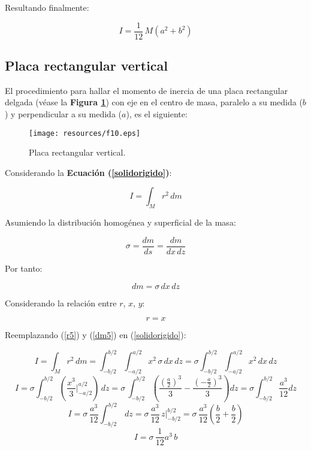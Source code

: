 \documentclass[letter,oneside,11pt]{article}
\begin{document}
Resultando finalmente:

\begin{equation}
    I = \frac{1}{12}\, M (a^2 + b^2)
\end{equation}

\subsection{Placa rectangular vertical}
El procedimiento para hallar el momento de inercia de una placa rectangular
delgada (véase la \textbf{Figura \ref{figura10}}) con eje en el centro de masa,
paralelo a su medida ($b$) y perpendicular a su medida ($a$), es el siguiente:

\begin{figure}
\centering
\texttt{[image: resources/f10.eps]}
\caption{Placa rectangular vertical.}
\label{figura10}
\end{figure}

Considerando la \textbf{Ecuación (\ref{solidorigido})}:

\begin{equation*}
    I = \int_{M} r^2\, dm
\tag{4}
\end{equation*}

Asumiendo la distribución homogénea y superficial de la masa:

\begin{equation*}
    \sigma = \frac{dm}{ds} = \frac{dm}{dx\, dz}
\end{equation*}

Por tanto:

\begin{equation}
    dm = \sigma\, dx\, dz
\label{dm5}
\end{equation}

Considerando la relación entre $r$, $x$, $y$:

\begin{equation}
    r = x
\label{r5}
\end{equation}

Reemplazando (\ref{r5}) y (\ref{dm5}) en (\ref{solidorigido}):

\begin{equation*}
    I = \int_{M} r^2\, dm = \int_{-b/2}^{b/2} \int_{-a/2}^{a/2} x^2\, \sigma\, dx\, dz = \sigma \int_{-b/2}^{b/2} \int_{-a/2}^{a/2} x^2\, dx\, dz
\end{equation*}
\begin{equation*}
    I = \sigma \int_{-b/2}^{b/2} \left( \frac{x^3}{3} \Biggr|_{-a/2}^{a/2} \right) \, dz = \sigma\, \int_{-b/2}^{b/2} \left( \frac{(\frac{a}{2})^3}{3} - \frac{(-\frac{a}{2})^3}{3} \right) dz = \sigma \int_{-b/2}^{b/2} \frac{a^3}{12} dz
\end{equation*}
\begin{equation*}
    I = \sigma\, \frac{a^3}{12} \int_{-b/2}^{b/2}\, dz = \sigma\, \frac{a^3}{12}\, z \Biggr|_{-b/2}^{b/2} = \sigma\, \frac{a^3}{12} \left( \frac{b}{2} + \frac{b}{2} \right)
\end{equation*}
\begin{equation}
    I = \sigma\, \frac{1}{12} a^3\, b
\label{resultado5}
\end{equation}
\end{document}
